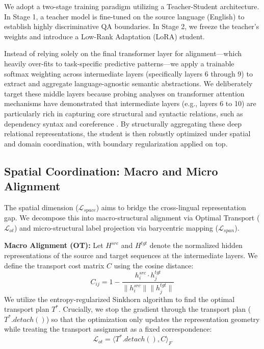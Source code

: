 \documentclass[11pt]{article}
\begin{document}
We adopt a two-stage training paradigm utilizing a Teacher-Student architecture. In Stage 1, a teacher model is fine-tuned on the source language (English) to establish highly discriminative QA boundaries. In Stage 2, we freeze the teacher's weights and introduce a Low-Rank Adaptation (LoRA) student. 

Instead of relying solely on the final transformer layer for alignment—which heavily over-fits to task-specific predictive patterns—we apply a trainable softmax weighting across intermediate layers (specifically layers 6 through 9) to extract and aggregate language-agnostic semantic abstractions. We deliberately target these middle layers because probing analyses on transformer attention mechanisms have demonstrated that intermediate layers (e.g., layers 6 to 10) are particularly rich in capturing core structural and syntactic relations, such as dependency syntax and coreference \cite{clark-etal-2019-bert}. By structurally aggregating these deep relational representations, the student is then robustly optimized under spatial and domain coordination, with boundary regularization applied on top.

\subsection{Spatial Coordination: Macro and Micro Alignment}
The spatial dimension ($\mathcal{L}_{space}$) aims to bridge the cross-lingual representation gap. We decompose this into macro-structural alignment via Optimal Transport ($\mathcal{L}_{ot}$) and micro-structural label projection via barycentric mapping ($\mathcal{L}_{span}$).

\textbf{Macro Alignment (OT):} Let $H^{src}$ and $H^{tgt}$ denote the normalized hidden representations of the source and target sequences at the intermediate layers. We define the transport cost matrix $C$ using the cosine distance:
$$ C_{ij} = 1 - \frac{h^{src}_i \cdot h^{tgt}_j}{\|h^{src}_i\| \|h^{tgt}_j\|} $$
We utilize the entropy-regularized Sinkhorn algorithm to find the optimal transport plan $T^*$. Crucially, we stop the gradient through the transport plan ($T^*.detach()$) so that the optimization only updates the representation geometry while treating the transport assignment as a fixed correspondence:
$$ \mathcal{L}_{ot} = \langle T^*.detach(), C \rangle_F $$
\end{document}
